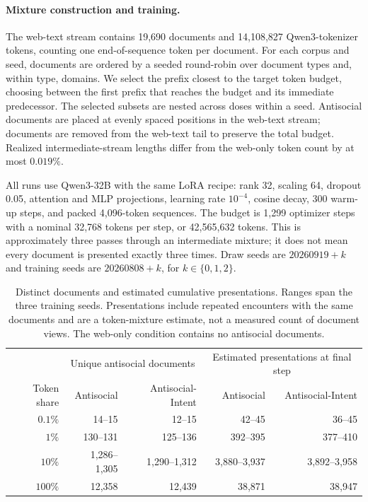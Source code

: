 \documentclass{article} %
\begin{document}
\paragraph{Mixture construction and training.}
The web-text stream contains 19,690 documents and 14,108,827 Qwen3-tokenizer tokens, counting one end-of-sequence token per document. For each corpus and seed, documents are ordered by a seeded round-robin over document types and, within type, domains. We select the prefix closest to the target token budget, choosing between the first prefix that reaches the budget and its immediate predecessor. The selected subsets are nested across doses within a seed. Antisocial documents are placed at evenly spaced positions in the web-text stream; documents are removed from the web-text tail to preserve the total budget. Realized intermediate-stream lengths differ from the web-only token count by at most $0.019\%$.

All runs use Qwen3-32B with the same LoRA recipe: rank 32, scaling 64, dropout 0.05, attention and MLP projections, learning rate $10^{-4}$, cosine decay, 300 warm-up steps, and packed 4,096-token sequences. The budget is 1,299 optimizer steps with a nominal 32,768 tokens per step, or 42,565,632 tokens. This is approximately three passes through an intermediate mixture; it does not mean every document is presented exactly three times. Draw seeds are $20260919+k$ and training seeds are $20260808+k$, for $k\in\{0,1,2\}$.

\begin{table}[t]
\centering\small
\begin{tabular}{r rr rr}
\toprule
& \multicolumn{2}{c}{Unique antisocial documents} & \multicolumn{2}{c}{Estimated presentations at final step} \\
Token share & Antisocial & Antisocial-Intent & Antisocial & Antisocial-Intent \\
\midrule
$0.1\%$ & 14--15 & 12--15 & 42--45 & 36--45 \\
$1\%$ & 130--131 & 125--136 & 392--395 & 377--410 \\
$10\%$ & 1,286--1,305 & 1,290--1,312 & 3,880--3,937 & 3,892--3,958 \\
$100\%$ & 12,358 & 12,439 & 38,871 & 38,947 \\
\bottomrule
\end{tabular}
\caption{Distinct documents and estimated cumulative presentations. Ranges span the three training seeds. Presentations include repeated encounters with the same documents and are a token-mixture estimate, not a measured count of document views. The web-only condition contains no antisocial documents.}
\label{tab:dose-exposure}
\end{table}
\end{document}
